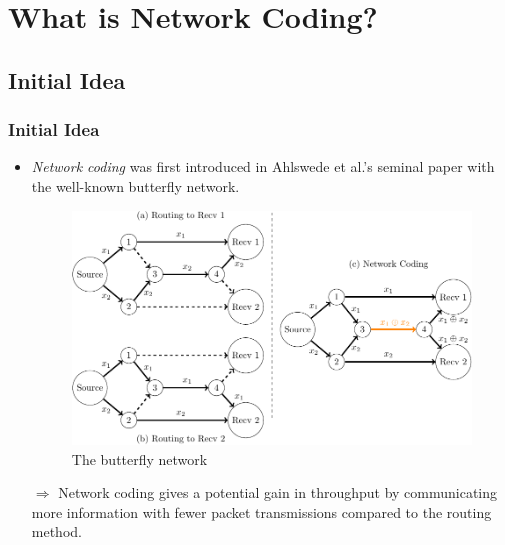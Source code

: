 \documentclass[c]{beamer}
\begin{document}

	




\section{What is Network Coding?}
\subsection{Initial Idea}
\begin{frame}[c]
\frametitle{Initial Idea}

	\begin{itemize}
		\item \textit{Network coding} was first introduced in Ahlswede et al.'s seminal paper \cite{Ahlswede:2000} with the well-known butterfly network.
			\begin{figure}[H]	
			\centering{}\includegraphics[width=0.5\paperwidth]{../figures/ahlswede_butterfly_network}
			\caption{The butterfly network \label{fig:The-butterfly-network}}
			\end{figure}
		\item[$\Longrightarrow$] Network coding gives a potential gain in throughput by communicating more information with fewer packet transmissions compared to the routing method.
	\end{itemize}

\end{frame}
\end{document}
